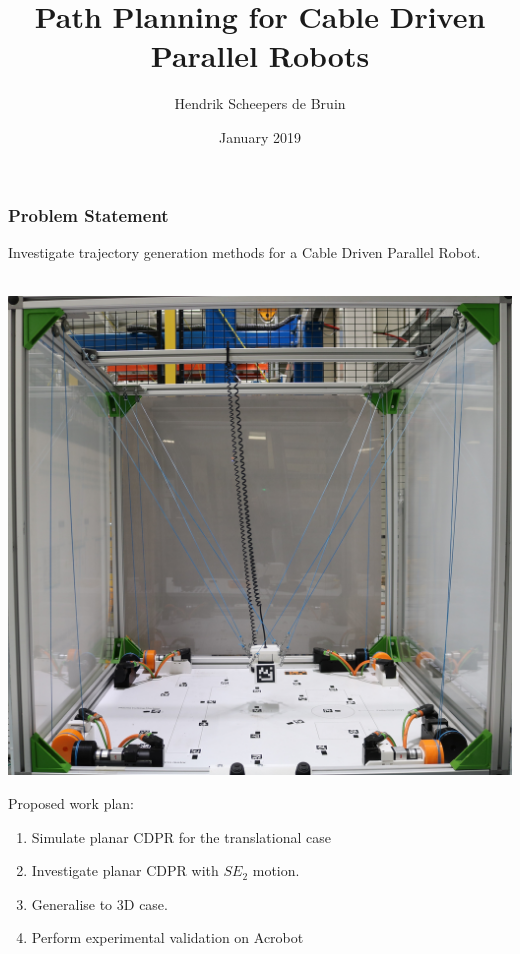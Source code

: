 \documentclass{beamer}
\title{Path Planning for Cable Driven Parallel Robots}
\author{Hendrik Scheepers de Bruin}
\institute{École Centrale de Nantes, Università degli Studi di Genova}
\date{January 2019}
\begin{document}

	\frame{\titlepage}

	\begin{frame}
		\frametitle{Problem Statement}

		Investigate trajectory generation methods for a Cable Driven Parallel
		Robot.
		\\~\

		\begin{minipage}{\textwidth}
			\begin{minipage}{0.5\textwidth}
				\centering
				\includegraphics[width=.9\textwidth]{acrobotHD}
			\end{minipage}
			\begin{minipage}{0.5\textwidth}

				Proposed work plan:

				\begin{enumerate}

					\item

						Simulate planar CDPR for the translational case

					\item

						Investigate planar CDPR with $SE_2$ motion.

					\item

						Generalise to 3D case.

					\item

						Perform experimental validation on Acrobot

				\end{enumerate}
			\end{minipage}
		\end{minipage}

	\end{frame}
\end{document}
